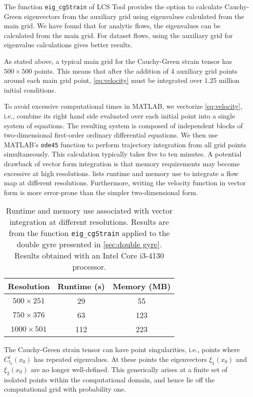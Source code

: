 \documentclass[5p]{elsarticle}
\begin{document}
The function \lstinline!eig_cgStrain! of LCS Tool provides the option to calculate Cauchy-Green eigenvectors from the auxiliary grid using eigenvalues calculated from the main grid.
We have found that for analytic flows, the eigenvalues can be calculated from the main grid.
For dataset flows, using the auxiliary grid for eigenvalue calculations gives better results.

As stated above, a typical main grid for the Cauchy-Green strain tensor has $500 \times 500$ points.
This means that after the addition of 4 auxiliary grid points around each main grid point, \cref{eq:velocity} must be integrated over 1.25 million initial conditions.

To avoid excessive computational times in MATLAB, we vectorize \cref{eq:velocity}, i.e., combine its right hand side evaluated over each initial point into a single system of equations. The resulting system is composed of independent blocks of two-dimensional first-order ordinary differential equations. We then use MATLAB's \lstinline!ode45! function to perform trajectory integration from all grid points simultaneously. This calculation typically takes five to ten minutes.
A potential drawback of vector form integration is that memory requirements may become excessive at high resolutions.
 lists runtime and memory use to integrate a flow map at different resolutions.
Furthermore, writing the velocity function in vector form is more error-prone than the simpler two-dimensional form.

\begin{table}
\begin{center}
\begin{tabular}{|c|c|c|}
\hline
Resolution & Runtime (s) & Memory (MB)\tabularnewline
\hline \hline
$500 \times 251$ & 29 & 55\tabularnewline
\hline
$750 \times 376$ & 63 & 123\tabularnewline
\hline
$1000 \times 501$ & 112 & 223\tabularnewline
\hline
\end{tabular}
\end{center}
\caption{Runtime and memory use associated with vector integration at different resolutions. Results are from the function \lstinline!eig_cgStrain! applied to the double gyre presented in \cref{sec:double gyre}. Results obtained with an Intel Core i3-4130 processor.}
\label{t:vector integration memory}
\end{table}

The Cauchy-Green strain tensor can have point singularities, i.e., points where $C_{t_0}^t(x_0)$ has repeated eigenvalues.
At these points the eigenvectors $\xi_1(x_0)$ and $\xi_2(x_0)$ are no longer well-defined.
This generically arises at a finite set of isolated points within the computational domain\citep{delmarcelle94}, and hence lie off the computational grid with probability one.
\end{document}
